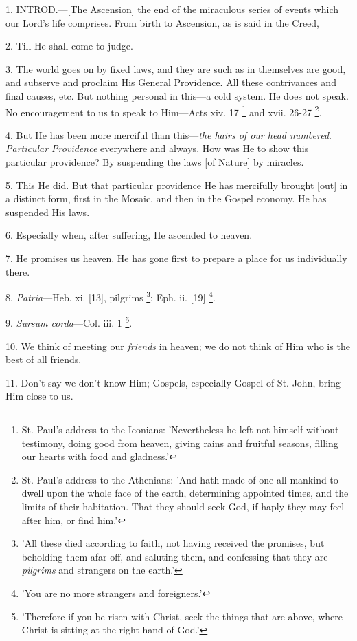 1. INTROD.—[The
Ascension] the end of the miraculous series of events which our Lord's
life comprises. From birth to Ascension, as is said in the Creed,

2. Till He shall come to judge.

3. The world goes on by fixed laws, and they are
such as in themselves are good, and subserve and proclaim His General
Providence. All these contrivances and final causes, etc. But nothing
personal in this—a cold system. He does not speak. No encouragement
to us to speak to Him—Acts xiv. 17 \footnote{St. Paul's address to
the Iconians: 'Nevertheless he left not himself without testimony,
doing good from heaven, giving rains and fruitful seasons, filling our
hearts with food and gladness.'} and xvii. 26-27 \footnote{St. Paul's address to
the Athenians: 'And hath made of one all mankind to dwell upon the
whole face of the earth, determining appointed times, and the limits
of their habitation. That they should seek God, if haply they may feel
after him, or find him.'}.

4. But He has been more merciful than this—\emph{the
hairs of our head numbered}. \emph{Particular Providence}
everywhere and always. How was He to show this particular providence?
By suspending the laws [of Nature] by miracles.

5. This He did. But that particular providence He
has mercifully brought [out] in a distinct form, first in the Mosaic,
and then in the Gospel economy. He has suspended His laws.

6. Especially when, after suffering, He ascended
to heaven.

7. He promises us heaven. He has gone first to
prepare a place for us individually there.

8. \emph{Patria}—Heb. xi. [13], pilgrims \footnote{'All these died
according to faith, not having received the promises, but beholding
them afar off, and saluting them, and confessing that they are \emph{pilgrims}
and strangers on the earth.'}; Eph. ii. [19] \footnote{'You are no more
strangers and foreigners.'}.

9. \emph{Sursum corda}—Col. iii. 1 \footnote{'Therefore if you be
risen with Christ, seek the things that are above, where Christ is
sitting at the right hand of God.'}.

10. We think of meeting our \emph{friends} in
heaven; we do not think of Him who is the best of all friends.

11. Don't say we don't know Him; Gospels,
especially Gospel of St. John, bring Him close to us.

